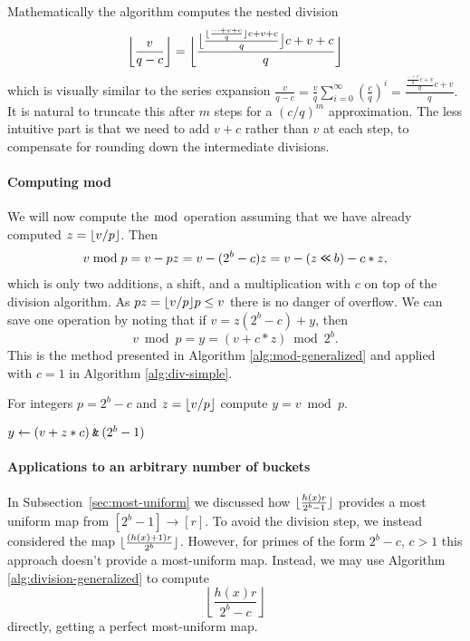 Mathematically the algorithm computes the nested division
$$
	\bbfloor{\frac{v}{q-c}}
	=
	\bbfloor{\frac{
			\bfloor{\frac{
					\floor{\frac{
							\dots+v+c
						}{q}}c +v+c
				}{q}}c +v+c
		}{q}}
	\vspace{-1em} %
$$
which is visually similar to the series expansion
$
	\frac{v}{q-c}
	= \frac{v}{q}\sum_{i=0}^\infty (\frac{c}{q})^i
	= \frac{\frac{\frac{\dots+v}{q}c+v}{q}c+v}{q}.
$
It is natural to truncate this after $m$ steps for a $(c/q)^m$ approximation.
The less intuitive part is that we need to add $v+c$ rather than $v$ at each step, to compensate for rounding down the intermediate divisions.

\paragraph{Computing mod}
We will now compute the $\bmod$ operation assuming that
we have already computed $z=\lfloor {v/p} \rfloor$. Then
\begin{align}
	v \bmod p
	= v - pz
	= v - (2^b-c)z
	= v - (z\mathbin{\texttt{<\!<}} b) - c*z,
\end{align}
which is only two additions, a shift, and a multiplication with $c$ on top of the division algorithm.
As $pz = \lfloor {v/p} \rfloor p \le v$ there is no danger of overflow.
We can save one operation by noting
that if $v = z (2^b-c) + y$, then
$$v\bmod p = y=\left(v+c*z \right) \bmod 2^b.$$
This is the method presented in Algorithm \ref{alg:mod-generalized} and applied with $c=1$ in Algorithm \ref{alg:div-simple}.
\begin{algorithm}[H]
	\caption{For integers $p=2^b-c$ and $z=\lfloor {v/p} \rfloor$ compute
		$y=v \bmod p$.}
	\label{alg:mod-generalized}
	\begin{algorithmic}
		\State $y \gets (v + z*c) \mathbin{\texttt{\&}} (2^b-1)$
	\end{algorithmic}
\end{algorithm}




 \paragraph{Applications to an arbitrary number of buckets}
 In Subsection~\ref{sec:most-uniform} we discussed how $\lfloor {\frac{h(x)r}{2^b-1}} \rfloor$ provides a most uniform map from $[2^b-1]\to[r]$.
 To avoid the division step, we instead considered the map
 $\lfloor {\frac{(h(x)+1)r}{2^b}} \rfloor$.
 However, for primes of the form $2^b-c$, $c>1$ this approach doesn't provide a most-uniform map.
 Instead, we may use Algorithm \ref{alg:division-generalized} to compute
 $$\left\lfloor\frac{h(x)r}{2^b-c}\right\rfloor$$
 directly, getting a perfect most-uniform map.
 

